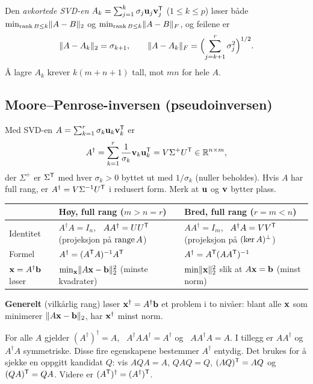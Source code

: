 \begin{teorem}
Den \emph{avkortede SVD-en} $A_k=\sum_{j=1}^{k}\sigma_j\mathbf{u}_j\mathbf{v}_j^{\mathsf{T}}$ ($1\le k\le p$) løser både
$\min_{\operatorname{rank} B\le k}\lVert A-B\rVert_2$ og $\min_{\operatorname{rank} B\le k}\lVert A-B\rVert_F$, og feilene er
\[
\lVert A-A_k\rVert_2=\sigma_{k+1},\qquad \lVert A-A_k\rVert_F=\Bigl(\sum_{j=k+1}^{r}\sigma_j^2\Bigr)^{1/2}.
\]
Å lagre $A_k$ krever $k(m+n+1)$ tall, mot $mn$ for hele $A$.
\end{teorem}

\subsection{Moore--Penrose-inversen (pseudoinversen)}
\begin{defn}[pseudoinvers]
Med SVD-en $A=\sum_{k=1}^r\sigma_k\mathbf{u}_k\mathbf{v}_k^{\mathsf{T}}$ er
\[
A^\dagger=\sum_{k=1}^{r}\frac{1}{\sigma_k}\mathbf{v}_k\mathbf{u}_k^{\mathsf{T}}=V\Sigma^{+}U^{\mathsf{T}}\in\mathbb{R}^{n\times m},
\]
der $\Sigma^+$ er $\Sigma^{\mathsf{T}}$ med hver $\sigma_k>0$ byttet ut med $1/\sigma_k$ (nuller beholdes). Hvis $A$ har full rang, er $A^\dagger=V\Sigma^{-1}U^{\mathsf{T}}$ i redusert form. Merk at $\mathbf{u}$ og $\mathbf{v}$ bytter plass.
\end{defn}

\begin{teorem}
\begin{center}
\small
\begin{tabularx}{\textwidth}{@{}l X X@{}}
\toprule
& Høy, full rang ($m>n=r$) & Bred, full rang ($r=m<n$) \\
\midrule
Identitet & $A^\dagger A=I_n$, \ $AA^\dagger=UU^{\mathsf{T}}$ (projeksjon på $\operatorname{range} A$) & $AA^\dagger=I_m$, \ $A^\dagger A=VV^{\mathsf{T}}$ (projeksjon på $(\operatorname{ker} A)^\perp$) \\
Formel & $A^\dagger=(A^{\mathsf{T}} A)^{-1}A^{\mathsf{T}}$ & $A^\dagger=A^{\mathsf{T}}(AA^{\mathsf{T}})^{-1}$ \\
$\mathbf{x}=A^\dagger\mathbf{b}$ løser & $\min_{\mathbf{x}}\lVert A\mathbf{x}-\mathbf{b}\rVert_2^2$ (minste kvadrater) & $\min\lVert \mathbf{x}\rVert_2^2$ slik at $A\mathbf{x}=\mathbf{b}$ (minst norm) \\
\bottomrule
\end{tabularx}
\end{center}
\textbf{Generelt} (vilkårlig rang) løser $\mathbf{x}^\dagger=A^\dagger\mathbf{b}$ et problem i to nivåer: blant alle $\mathbf{x}$ som minimerer $\lVert A\mathbf{x}-\mathbf{b}\rVert_2$, har $\mathbf{x}^\dagger$ minst norm.
\end{teorem}

\begin{teorem}
For alle $A$ gjelder $(A^\dagger)^\dagger=A$, \ $A^\dagger AA^\dagger=A^\dagger$ og \ $AA^\dagger A=A$. I tillegg er $AA^\dagger$ og $A^\dagger A$ symmetriske. Disse fire egenskapene bestemmer $A^\dagger$ entydig. Det brukes for å sjekke en oppgitt kandidat $Q$: vis $AQA=A$, $QAQ=Q$, $(AQ)^{\mathsf{T}}=AQ$ og $(QA)^{\mathsf{T}}=QA$. Videre er $(A^{\mathsf{T}})^\dagger=(A^\dagger)^{\mathsf{T}}$.
\end{teorem}

